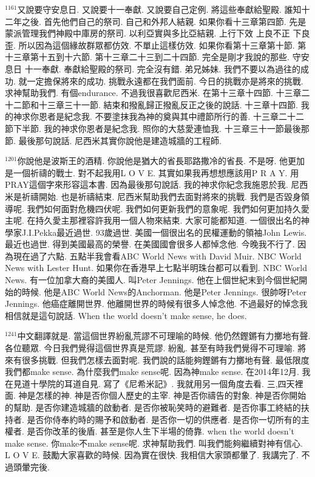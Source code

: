\documentclass{book}
\begin{document}
$^{1161}$又說要守安息日.
又說要十一奉獻.
又說要自己定例.
將這些奉獻給聖殿.
誰知十二年之後.
首先他們自己的祭司.
自己和外邦人結親.
如果你看十三章第四節.
先是蒙派管理我們神殿中庫房的祭司.
以利亞實與多比亞結親.
上行下效 上良不正 下良歪.
所以因為這個緣故群眾都仿效.
不單止這樣仿效.
如果你看第十三章第十節.
第十三章第十五到十六節.
第十三章二十三到二十四節.
完全是剛才我說的那些.
守安息日 十一奉獻.
奉獻給聖殿的祭司.
完全沒有錯.
弟兄姊妹.
我們不要以為過往的成功.
就一定擔保將來的成功.
挑戰永遠都在我們面前.
今日的挑戰亦是將來的挑戰.
求神幫助我們.
有個endurance.
不過我很喜歡尼西米.
在第十三章十四節.
十三章二十二節和十三章三十一節.
結束和撥亂歸正撥亂反正之後的說話.
十三章十四節.
我的神求你恩者是紀念我.
不要塗抹我為神的奠與其中禮節所行的善.
十三章二十二節下半節.
我的神求你恩者是紀念我.
照你的大慈愛連恤我.
十三章三十一節最後那節.
最後那句說話.
尼西米其實你說他是建造城牆的工程師.

$^{1201}$你說他是波斯王的酒精.
你說他是猶大的省長耶路撒冷的省長.
不是呀.
他更加是一個祈禱的戰士.
對不起我用L O V E.
其實如果我再想想應該用P R A Y.
用PRAY這個字來形容這本書.
因為最後那句說話.
我的神求你紀念我施恩於我.
尼西米是祈禱開始.
也是祈禱結束.
尼西米幫助我們去面對將來的挑戰.
我們是否毀身領導呢.
我們如何面對危機四伏呢.
我們如何更新我們的意象呢.
我們如何更加持久愛主呢.
在持久愛主那裡容許我用一個人物來結束.
大家可能都知道.
一個很出名的神學家J.I.Pekka最近過世.
93歲過世.
美國一個很出名的民權運動的領袖John Lewis.
最近也過世.
得到美國最高的榮譽.
在美國國會很多人都悼念他.
今晚我不行了.
因為現在過了六點.
五點半我會看ABC World News with David Muir.
NBC World News with Lester Hunt.
如果你在香港早上七點半明珠台都可以看到.
NBC World News.
有一位加拿大裔的美國人.
叫Peter Jennings.
他在上個世紀末到今個世紀開始的時候.
他是ABC World News的Anchorman.
他是Peter Jennings.
很帥呀Peter Jennings.
他癌症離開世界.
他離開世界的時候有很多人悼念他.
不過最好的悼念我相信就是這句說話.
When the world doesn't make sense, he does.

$^{1241}$中文翻譯就是.
當這個世界紛亂荒謬不可理喻的時候.
他仍然鏗鏘有力擲地有聲.
各位聽眾.
今日我們覺得這個世界真是荒謬.
紛亂.
甚至有時我們覺得不可理喻.
將來有很多挑戰.
但我們怎樣去面對呢.
我們說的話能夠鏗鏘有力擲地有聲.
最低限度我們都make sense.
為什麼我們make sense呢.
因為神make sense.
在2014年12月.
我在見道十學院的耳道自見.
寫了《尼希米記》.
我就用另一個角度去看.
三,四天裡面.
神是怎樣的神.
神是否你個人歷史的主宰.
神是否你禱告的對象.
神是否你開始的幫助.
是否你建造城牆的啟動者.
是否你被恥笑時的避難者.
是否你事工終結的扶持者.
是否你侍奉約時的賜予和啟動者.
是否你一切的供應者.
是否你一切所有的主權者.
是否你改革的後盾.
甚至是你人生下半場的倚靠.
when the world doesn't make sense.
你make不make sense呢.
求神幫助我們.
叫我們能夠繼續對神有信心.
L O V E.
鼓勵大家喜歡的時候.
因為實在很快.
我相信大家頭都暈了.
我講完了.
不過頭暈完後.
\end{document}

